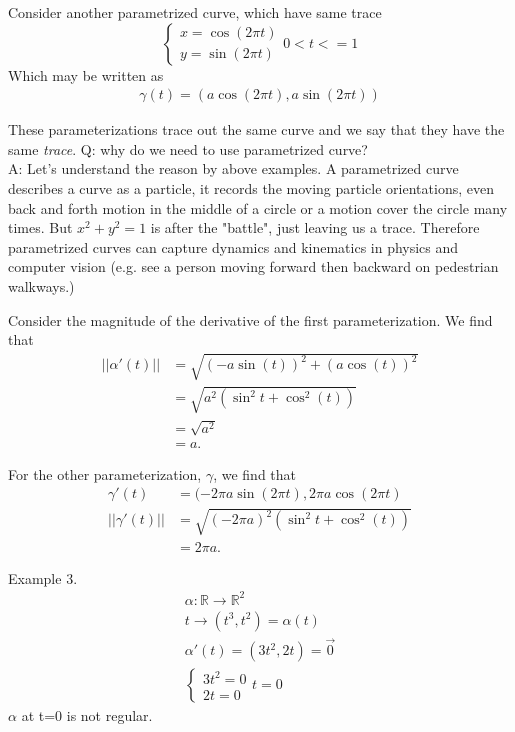 \documentclass{article}
\begin{document}
Consider another parametrized curve, which have same trace
\[
\begin{cases}
        x = \cos(2 \pi t) \\
        y = \sin(2 \pi t)  
\end{cases}
0 < t <= 1 
\]
Which may be written as 
\begin{align*}
    \gamma(t) = (a \cos(2 \pi t), a \sin(2 \pi t))
\end{align*}


These parameterizations trace out the same curve and we say that they have the same \textit{trace}.
Q: why do we need to use parametrized curve? \\
A: Let's understand the reason by above examples.  A parametrized curve describes a curve as a particle, it records the moving particle orientations, even back and forth motion in the middle of a circle or a motion cover the circle many times. But $x^2 + y^2 =1$ is after the "battle", just leaving us a trace.  Therefore parametrized curves can capture dynamics and kinematics in physics and computer vision (e.g. see a person moving forward then backward on pedestrian walkways.)

Consider the magnitude of the derivative of the first parameterization.
We find that 
\begin{align*}
    ||\alpha'(t)|| &= \sqrt{(-a \sin(t))^2 + (a \cos(t))^2}\\
    &= \sqrt{a^2(\sin^2t + \cos^2(t))}\\
    &= \sqrt{a^2}\\
    &= a.
\end{align*}

For the other parameterization, $\gamma$, we find that 
\begin{align*}
    \gamma'(t) &= (-2 \pi a \sin( 2 \pi t), 2 \pi a \cos( 2 \pi t)\\
    ||\gamma'(t)||&= \sqrt{(-2 \pi a)^2(\sin^2t + \cos^2(t))}\\
    &= 2 \pi a.
\end{align*}

Example 3.
\begin{align*}
    \alpha \colon \mathbb{R} \to \mathbb{R}^2 \\
    t \to (t^3, t^2) = \alpha(t)\\
    \alpha'(t) = (3t^2, 2t) = \vec{0} \\
    \begin{cases}
            3t^2 = 0\\
            2t = 0
    \end{cases}
    t=0
\end{align*}
$\alpha$ at t=0 is not regular.
\end{document}
